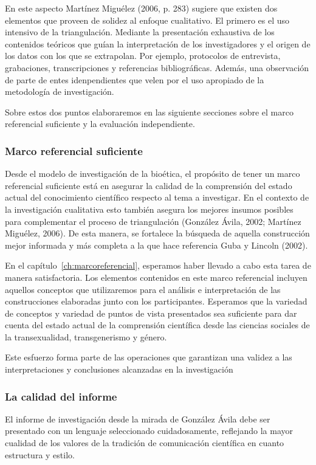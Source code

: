 En este aspecto Martínez Miguélez (2006, p. 283) sugiere que existen dos
elementos que proveen de solidez al enfoque cualitativo.
El primero es el uso intensivo de la triangulación.
Mediante la presentación exhaustiva de los contenidos teóricos que guían la
interpretación de los investigadores y el origen de los datos con los que se
extrapolan.
Por ejemplo, protocolos de entrevista, grabaciones, transcripciones y
referencias bibliográficas.
Además, una observación de parte de entes idenpendientes que velen por el uso
apropiado de la metodología de investigación.

Sobre estos dos puntos elaboraremos en las siguiente secciones sobre el marco
referencial suficiente y la evaluación independiente.

    \subsubsection{Marco referencial suficiente}
Desde el modelo de investigación de la bioética, el propósito de tener un
marco referencial suficiente está en asegurar la calidad de la comprensión
del estado actual del conocimiento científico respecto al tema a investigar.
En el contexto de la investigación cualitativa esto también asegura los
mejores insumos posibles para complementar el proceso de triangulación
(González Ávila, 2002; Martínez Miguélez, 2006).
De esta manera, se fortalece la búsqueda de aquella construcción mejor
informada y más completa a la que hace referencia Guba y Lincoln (2002).

En el capítulo~\ref{ch:marcoreferencial}, esperamos haber llevado a cabo esta
tarea de manera satisfactoria.
Los elementos contenidos en este marco referencial incluyen aquellos
conceptos que utilizaremos para el análisis e interpretación de las
construcciones elaboradas junto con los participantes.
Esperamos que la variedad de conceptos y variedad de puntos de vista
presentados sea suficiente para dar cuenta del estado actual de la
comprensión científica desde las ciencias sociales de la transexualidad,
transgenerismo y género.

Este esfuerzo forma parte de las operaciones que garantizan una validez a las
interpretaciones y conclusiones alcanzadas en la investigación

    \subsubsection{La calidad del informe}
El informe de investigación desde la mirada de González Ávila debe ser
presentado con un lenguaje seleccionado cuidadosamente, reflejando la mayor
cualidad de los valores de la tradición de comunicación científica en cuanto
estructura y estilo.

